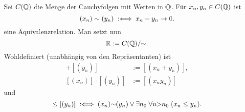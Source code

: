 \noindent
{}
Sei $C(\mathbb Q)$ die Menge der Cauchyfolgen mit Werten in $\mathbb Q$.
Für $x_n,y_n\in C(\mathbb Q)$ ist
\begin{equation}
(x_n)\sim (y_n) \;:\Longleftrightarrow\; x_n-y_n\to 0.
\end{equation}
eine Äquivalenzrelation. Man setzt nun
\begin{equation}
\mathbb R := C(\mathbb Q)/{\sim}.
\end{equation}
Wohldefiniert (unabhängig von den Repräsentanten) ist
\begin{align}
[(x_n)]+[(y_n)] &:= [(x_n+y_n)],\\
[(x_n)]\cdot [(y_n)] &:= [(x_n y_n)]
\end{align}
und
\begin{equation}
[(x_n)]\le [(y_n)] \defiff
(x_n){\sim}(y_n)\lor \exists n_0\;\forall n{>}n_0\;(x_n\le y_n).
\end{equation}

